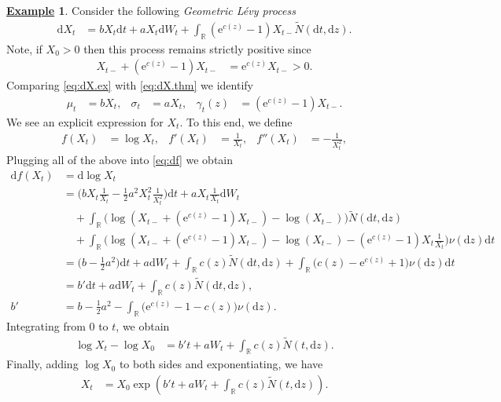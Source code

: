 \documentclass[12pt]{book}
\numberwithin{equation}{chapter}
\theoremstyle{plain}
\numberwithin{theorem}{section}
\theoremstyle{definition}
\newtheorem{example}[theorem]{\underline{Example}}
\numberwithin{exercise}{chapter}
\newcommand{\<}{\langle}
\renewcommand{\>}{\rangle}
\renewcommand{\(}{\left(}
\renewcommand{\)}{\right)}
\renewcommand{\[}{\left[}
\renewcommand{\]}{\right]}
\newcommand\Rb{\mathds{R}}
\newcommand\sig{\sigma}
\newcommand\gam{\gamma}
\newcommand\Nt{\widetilde{N}}
\newcommand\dd{\mathrm{d}}
\newcommand\ee{\mathrm{e}}
\begin{document}
\begin{example}
Consider the following \emph{Geometric L\'evy process}
\begin{align}
\dd X_t
	&=	b X_t \dd t + a X_t \dd W_t + \int_\Rb \( \ee^{c(z)} - 1 \)  X_{t-}  \Nt( \dd t, \dd z) . \label{eq:dX.ex}
\end{align}
Note, if $X_0 > 0$ then this process remains strictly positive since
\begin{align}
X_{t-} +  \( \ee^{c(z)} - 1 \)  X_{t-}
	&=	\ee^{c(z)} X_{t-} > 0 .
\end{align}
Comparing \eqref{eq:dX.ex} with \eqref{eq:dX.thm} we identify
\begin{align}
\mu_t
	&=	b X_t , &
\sig_t
	&=	a X_t , &
\gam_{t}(z)
	&=	\( \ee^{c(z)} - 1 \) X_{t-} .
\end{align}
We see an explicit expression for $X_t$.  To this end, we define
\begin{align}
f(X_t)
	&=	\log X_t , &
f'(X_t)
	&=	\frac{1}{X_t} , &
f''(X_t)
	&=	- \frac{1}{X_t^2} ,
\end{align}
Plugging all of the above into \eqref{eq:df} we obtain
\begin{align}
\dd f(X_t)
	&=	\dd \log X_t \\
	&=	\Big( b X_t  \frac{1}{X_t} - \tfrac{1}{2} a^2 X_t^2 \frac{1}{X_t^2}  \Big) \dd t 
			+ a X_t \frac{1}{X_t} \dd W_t \\ &\quad
			+	\int_\Rb \Big( \log \(X_{t-} +\( \ee^{c(z)} - 1 \) X_{t-} \) - \log \( X_{t-} \) \Big) \Nt( \dd t, \dd z) \\ &\quad
			+	\int_\Rb \Big( \log \(X_{t-} + \( \ee^{c(z)} - 1 \) X_{t-} \) - \log \( X_{t-} \) - \( \ee^{c(z)} - 1 \) X_t \frac{1}{X_t} \Big) \nu(\dd z) \dd t \\
	&=	\Big( b - \tfrac{1}{2} a^2  \Big) \dd t 
			+ a \dd W_t 
			+	\int_\Rb  c(z) \Nt( \dd t, \dd z) 
			+	\int_\Rb \Big( c(z) - \ee^{c(z)} + 1 \Big) \nu(\dd z) \dd t \\
	&=	b' \dd t 
			+ a \dd W_t 
			+	\int_\Rb c(z) \Nt( \dd t, \dd z) , \\
b'
	&=	b - \tfrac{1}{2} a^2 - \int_\Rb \big( \ee^{c(z)} - 1 - c(z) \big) \nu( \dd z) .
\end{align}
Integrating from $0$ to $t$, we obtain
\begin{align}
\log X_t - \log X_0
	&=	b' t + a W_t +	\int_\Rb c(z) \Nt( t, \dd z) .
\end{align}
Finally, adding $\log X_0$ to both sides and exponentiating, we have
\begin{align}
X_t
	&=	X_0 \exp \( b' t + a W_t +	\int_\Rb c(z) \Nt( t, \dd z) \) .
\end{align}
\end{example}
\end{document}
